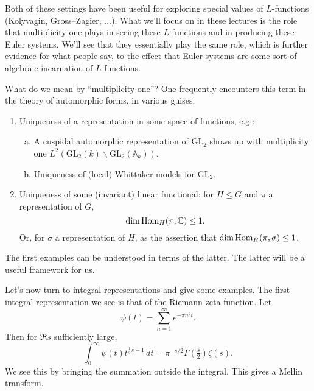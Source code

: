 \documentclass[reqno]{amsart} 
\numberwithin{theorem}{section}
\numberwithin{equation}{section}
\numberwithin{exercise}{section}
\begin{document}
Both of these settings have been useful for exploring special values of $L$-functions (Kolyvagin, Gross--Zagier, ...).  What we'll focus on in these lectures is the role that multiplicity one plays in seeing these $L$-functions and in producing these Euler systems.  We'll see that they essentially play the same role, which is further evidence for what people say, to the effect that Euler systems are some sort of algebraic incarnation of $L$-functions.

What do we mean by ``multiplicity one''?  One frequently encounters this term in the theory of automorphic forms, in various guises:
\begin{enumerate}
\item\label{enumerate:cq6r3ndbhy} Uniqueness of a representation in some space of functions, e.g.:
  \begin{enumerate}[(a)]
  \item\label{enumerate:cq6r3m96yd} A cuspidal automorphic representation of $\mathrm{GL}_2$ shows up with multiplicity one $L^2(\mathrm{GL}_2(k) \backslash \mathrm{GL}_2(\mathbb{A}_k))$.
  \item\label{enumerate:cq6r3m98gf} Uniqueness of (local) Whittaker models for $\mathrm{GL}_2$.
  \end{enumerate}
\item\label{enumerate:cq6r3ndama} Uniqueness of some (invariant) linear functional: for $H \leq G$ and $\pi$ a representation of $G$,
  \begin{equation*}
    \dim \operatorname{Hom}_H(\pi, \mathbb{C}) \leq 1.
  \end{equation*}
  Or, for $\sigma$ a representation of $H$, as the assertion that $\dim \operatorname{Hom}_H(\pi, \sigma) \leq 1$.
\end{enumerate}
The first examples can be understood in terms of the latter.  The latter will be a useful framework for us.

Let's now turn to integral representations and give some examples.  The first integral representation we see is that of the Riemann zeta function.  Let
\begin{equation}\label{eq:cq6r3qe33m}
  \psi(t) = \sum_{n = 1}^\infty e^{- \pi n^2 t}.
\end{equation}
Then for $\Re s$ sufficiently large,
\begin{equation}\label{eq:cq6r3p0tmc}
  \int_0^\infty \psi(t) t^{\frac{1}{2} s - 1} \, d t
  = \pi^{- s/2} \Gamma(\tfrac{s}{2}) \zeta(s).
\end{equation}
We see this by bringing the summation outside the integral.  This gives a Mellin transform.
\end{document}
